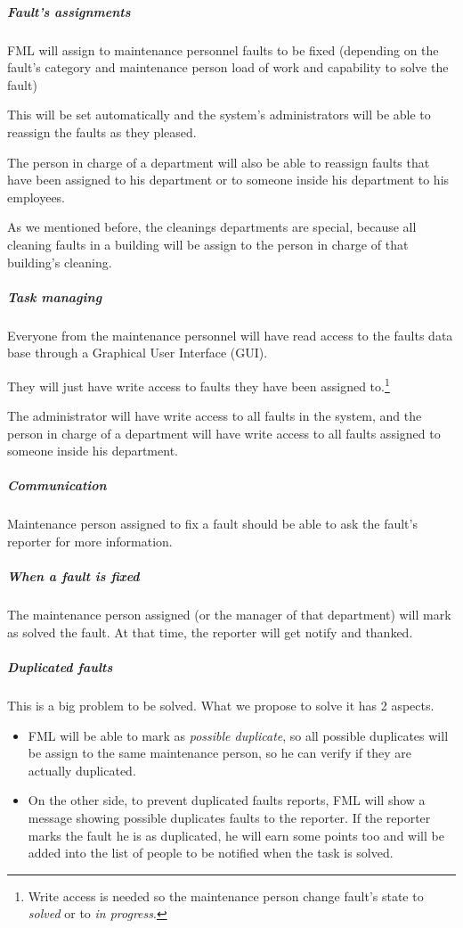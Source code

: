 \documentclass{report}
\begin{document}
\subparagraph{Fault's assignments} FML will assign to maintenance personnel faults to be fixed (depending on the fault's category and maintenance person load of work and capability to solve the fault)

This will be set automatically and the system's administrators will be able to reassign the faults as they pleased.

The person in charge of a department will also be able to reassign faults that have been assigned to his department or to someone inside his department to his employees.

As we mentioned before, the cleanings departments are special, because all cleaning faults in a building will be assign to the person in charge of that building's cleaning.

\subparagraph{Task managing} Everyone from the maintenance personnel will have read access to the faults data base through a Graphical User Interface (GUI).

They will just have write access to faults they have been assigned to.\footnote{Write access is needed so the maintenance person change fault's state to \textit{solved} or to \textit{in progress}.}

The administrator will have write access to all faults in the system, and the person in charge of a department will have write access to all faults assigned to someone inside his department.

\subparagraph{Communication} Maintenance person assigned to fix a fault should be able to ask the fault's reporter for more information.

\subparagraph{When a fault is fixed} The maintenance person assigned (or the manager of that department) will mark as solved the fault. At that time, the reporter will get notify and thanked.

\subparagraph{Duplicated faults} This is a big problem to be solved. What we propose to solve it has 2 aspects.
\begin{itemize}
\item FML will be able to mark as \textit{possible duplicate}, so all possible duplicates will be assign to the same maintenance person, so he can verify if they are actually duplicated.

\item On the other side, to prevent duplicated faults reports, FML will show a message showing possible duplicates faults to the reporter. If the reporter marks the fault he is  as duplicated, he will earn some points too and will be added into the list of people to be notified when the task is solved.
\end{itemize}
\end{document}
